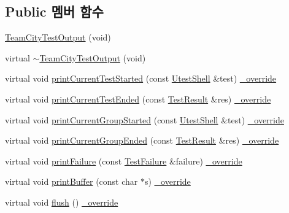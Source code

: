 \subsection*{Public 멤버 함수}
\begin{DoxyCompactItemize}
\item 
\hyperlink{class_team_city_test_output_a6aa2537236d11b40ae2909c4adc6c489}{Team\+City\+Test\+Output} (void)
\item 
virtual \hyperlink{class_team_city_test_output_aa7974ba6a51e153d80d5b7006f0196d8}{$\sim$\+Team\+City\+Test\+Output} (void)
\item 
virtual void \hyperlink{class_team_city_test_output_a5b7509d804ba2fb3be690077ae93345a}{print\+Current\+Test\+Started} (const \hyperlink{class_utest_shell}{Utest\+Shell} \&test) \hyperlink{_cpp_u_test_config_8h_a049bea15dd750e15869863c94c1efc3b}{\+\_\+override}
\item 
virtual void \hyperlink{class_team_city_test_output_a03ceb1aab29f845f5d0a6e5bb4124885}{print\+Current\+Test\+Ended} (const \hyperlink{class_test_result}{Test\+Result} \&res) \hyperlink{_cpp_u_test_config_8h_a049bea15dd750e15869863c94c1efc3b}{\+\_\+override}
\item 
virtual void \hyperlink{class_team_city_test_output_a0478e2d3cabe1da8114c90f0ae7e7227}{print\+Current\+Group\+Started} (const \hyperlink{class_utest_shell}{Utest\+Shell} \&test) \hyperlink{_cpp_u_test_config_8h_a049bea15dd750e15869863c94c1efc3b}{\+\_\+override}
\item 
virtual void \hyperlink{class_team_city_test_output_a19ba7b19942e492a0eab6ac4d3d90286}{print\+Current\+Group\+Ended} (const \hyperlink{class_test_result}{Test\+Result} \&res) \hyperlink{_cpp_u_test_config_8h_a049bea15dd750e15869863c94c1efc3b}{\+\_\+override}
\item 
virtual void \hyperlink{class_team_city_test_output_a5c917b949750083f7774dbcf412cfbc5}{print\+Failure} (const \hyperlink{class_test_failure}{Test\+Failure} \&failure) \hyperlink{_cpp_u_test_config_8h_a049bea15dd750e15869863c94c1efc3b}{\+\_\+override}
\item 
virtual void \hyperlink{class_console_test_output_a8b83bd531b9e38a5dd9c61e14bf1636c}{print\+Buffer} (const char $\ast$s) \hyperlink{_cpp_u_test_config_8h_a049bea15dd750e15869863c94c1efc3b}{\+\_\+override}
\item 
virtual void \hyperlink{class_console_test_output_a9fde218af86a81b79f82b86f3ddeabe5}{flush} () \hyperlink{_cpp_u_test_config_8h_a049bea15dd750e15869863c94c1efc3b}{\+\_\+override}
\item 

\end{DoxyCompactItemize}
